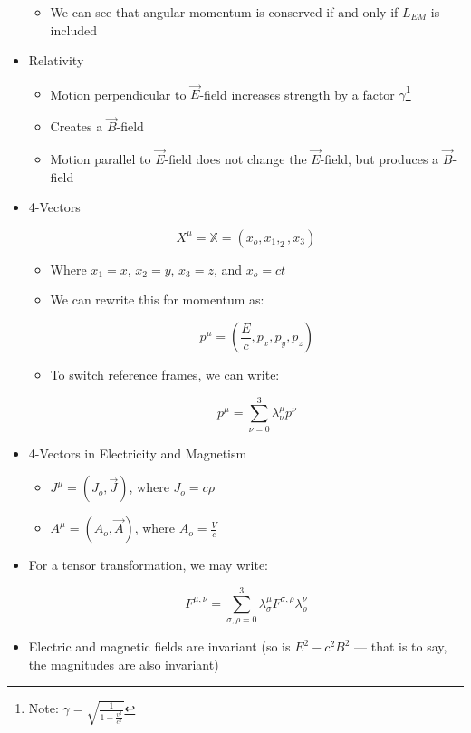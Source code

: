 \begin{itemize}
\begin{itemize}
      \item We can see that angular momentum is conserved if and only if $L_{EM}$ is included

    \end{itemize}

  \item Relativity

    \begin{itemize}

      \item Motion perpendicular to $\vec{E}$-field increases strength by a factor $\gamma$\footnote{Note: $\gamma=\sqrt{\frac{1}{1-\frac{v^2}{c^2}}}$}

      \item Creates a $\vec{B}$-field

      \item Motion parallel to $\vec{E}$-field does not change the $\vec{E}$-field, but produces a $\vec{B}$-field

    \end{itemize}

  \item 4-Vectors

    $$X^{\mu}=\mathbb{X}=(x_o,x_1,_2,x_3)$$

    \begin{itemize}

      \item Where $x_1=x$, $x_2=y$, $x_3=z$, and $x_o=ct$

      \item We can rewrite this for momentum as:

        $$p^{\mu}=\left( \frac{E}{c}, p_x, p_y, p_z \right)$$

      \item To switch reference frames, we can write:

        $$p^{\mu}=\sum_{\nu=0}^3\lambda^{\mu}_{\nu}p^\nu$$

    \end{itemize}

  \item 4-Vectors in Electricity and Magnetism

    \begin{itemize}

      \item $J^\mu=(J_o,\vec{J})$, where $J_o=c\rho$

      \item $A^{\mu}=(A_o,\vec{A})$, where $A_o=\frac{V}{c}$

    \end{itemize}

  \item For a tensor transformation, we may write:

    $$F^{\mu,\nu}=\sum_{\sigma,\rho=0}^3\lambda_\sigma^\mu F^{\sigma,\rho}\lambda_\rho^\nu$$

  \item Electric and magnetic fields are invariant (so is $E^2-c^2B^2$ — that is to say, the magnitudes are also invariant)

\end{itemize}



